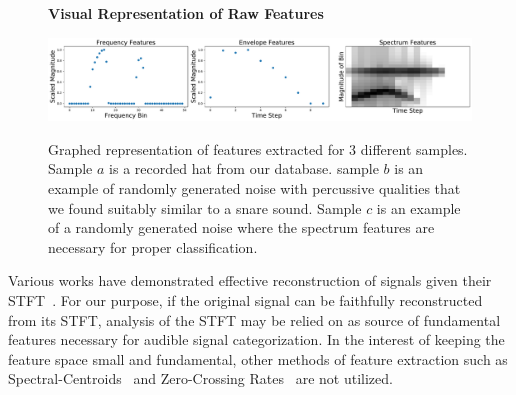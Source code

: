 \documentclass[\main/thesis.tex]{subfiles}
\begin{document}
\begin{figure}
\centering
\textbf{Visual Representation of Raw Features}\par\medskip
    { \includegraphics[width=1\columnwidth]{images/ff3.pdf}}
\caption{Graphed representation of features extracted for 3 different samples. Sample $a$ is a recorded hat from our database. sample $b$ is an example of randomly generated noise with percussive qualities that we found suitably similar to a snare sound. Sample $c$ is an example of a randomly generated noise where the spectrum features are necessary for proper classification.}
\label{fig:stackspectrums}
\end{figure}

Various works have demonstrated effective reconstruction of signals given their STFT~\cite{nawab1983signal,griffin1984signal}. For our purpose, if the original signal can be faithfully reconstructed from its STFT, analysis of the STFT may be relied on as source of fundamental features necessary for audible signal categorization. In the interest of keeping the feature space small and fundamental, other methods of feature extraction such as Spectral-Centroids~\cite{schubert2004spectral} and Zero-Crossing Rates~\cite{gouyon2000use} are not utilized.
\end{document}
